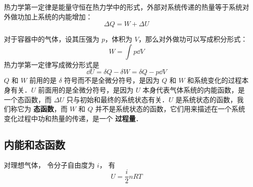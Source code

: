 
\begin{issues}
\issueDraft
\end{issues}


热力学第一定律是能量守恒在热力学中的形式，外部对系统传递的热量等于系统对外做功加上系统的内能增加：
\begin{equation}\label{Th1Law_eq1}
\Delta Q = W + \Delta U
\end{equation}

对于容器中的气体，设其压强为 $p$，体积为 $V$，那么对外做功可以写成积分形式：
\begin{equation}
W = \int p \dd{V}
\end{equation}
热力学第一定律写成微分形式是
\begin{equation}
\dd U=\delta Q-\delta W=\delta Q-p\dd V
\end{equation}
$Q$ 和 $W$ 前用的是 $\delta$ 符号而不是全微分符号，是因为 $Q$ 和 $W$ 和系统变化的过程本身有关．$U$ 前面用的是全微分符号，是因为 $U$ 本身代表气体系统的内能函数，是一个态函数，而 $\Delta U$ 只与初始和最终的系统状态有关．$U$ 是系统状态的函数，我们称它为 \textbf{态函数}，而 $W$ 和 $Q$ 并不是系统状态的函数，它们用来描述在一个系统变化过程中功和热量的传递，是一个 \textbf{过程量}．

\subsection{内能和态函数}
对理想气体， 令分子自由度为 $i$， 有
\begin{equation}
U = \frac{i}{2}n RT
\end{equation}
